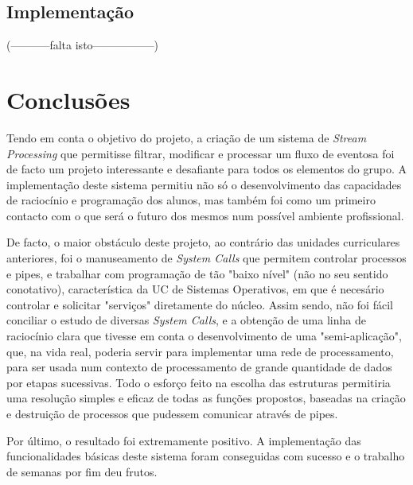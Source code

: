 \documentclass[a4paper]{article}
\begin{document}
\subsection{Implementação}(-----------falta isto-----------------)
\label{sec:5}


\section{Conclusões}
\label{sec:6}

\hspace{3mm} Tendo em conta o objetivo do projeto, a criação de um sistema de \emph{Stream Processing} que permitisse filtrar, modificar e processar um fluxo de eventosa foi de facto um projeto interessante e desafiante para todos os elementos do grupo. A implementação deste sistema permitiu não só o desenvolvimento das capacidades de raciocínio e programação dos alunos, mas também foi como um primeiro contacto com o que será o futuro dos mesmos num possível ambiente profissional. 
\par De facto, o maior obstáculo deste projeto, ao contrário das unidades curriculares anteriores, foi o manuseamento de \emph{System Calls} que permitem controlar processos e pipes, e trabalhar com programação de tão "baixo nível" (não no seu sentido conotativo), característica da UC de Sistemas Operativos, em que é necesário controlar e solicitar "serviços" diretamente do núcleo. Assim sendo, não foi fácil conciliar o estudo de diversas \emph{System Calls}, e a obtenção de uma linha de raciocínio clara que tivesse em conta o desenvolvimento de uma "semi-aplicação", que, na vida real, poderia servir para implementar uma rede de processamento, para ser usada  num contexto de processamento de grande quantidade de dados por etapas sucessivas. Todo o esforço feito na escolha das estruturas permitiria uma resolução simples e eficaz de todas as funções propostos, baseadas na criação e destruição de processos que pudessem comunicar através de pipes.
\par Por último, o resultado foi extremamente positivo. A implementação das funcionalidades básicas deste sistema foram conseguidas com sucesso e o trabalho de semanas por fim deu frutos.
\end{document}
